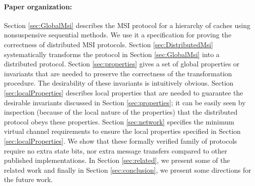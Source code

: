 \paragraph{Paper organization:} Section \ref{sec:GlobalMsi} describes the MSI
protocol for a hierarchy of caches using nonsuspensive sequential methods. We
use it a specification for proving the correctness of distributed MSI
protocols. Section \ref{sec:DistributedMsi} systematically transforms the
protocol in Section \ref{sec:GlobalMsi} into a distributed protocol. Section
\ref{sec:properties} gives a set of global properties or invariants that are
needed to preserve the correctness of the transformation procedure. The
desirability of these invariants is intuitively obvious. Section
\ref{sec:localProperties} describes local properties that are needed to
guarantee the desirable invariants discussed in Section \ref{sec:properties};
it can be easily seen by inspection (because of the local nature of the
properties) that the distributed protocol obeys these properties. Section
\ref{sec:network} specifies the minimum virtual channel requirements to ensure
the local properties specified in Section \ref{sec:localProperties}. We show
that these formally verified family of protocols require no extra state bits,
nor extra message transfers compared to other published implementations.  In
Section \ref{sec:related}, we present some of the related work and finally in
Section \ref{sec:conclusion}, we present some directions for the future work.
